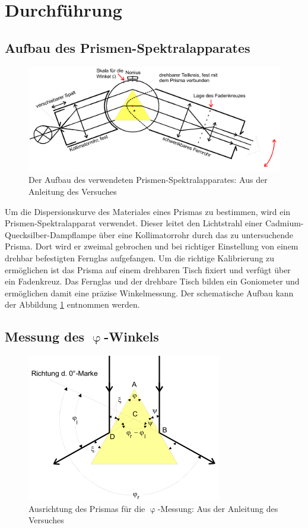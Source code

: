 \section{Durchführung}
\label{sec:Durchführung}
\subsection{Aufbau des Prismen-Spektralapparates}

\begin{figure}
  \centering
  \includegraphics[scale=0.7]{images/Aufbau.png}
  \caption{Der Aufbau des verwendeten Prismen-Spektralapparates: Aus der Anleitung des Versuches \cite[24]{1}}
  \label{fig:aufbau}
\end{figure}

Um die Dispersionskurve des Materiales eines Prismas zu bestimmen, wird ein Prismen-Spektralapparat verwendet.
Dieser leitet den Lichtstrahl einer Cadmium-Quecksilber-Dampflampe über eine Kollimatorrohr durch das zu untersuchende Prisma.
Dort wird er zweimal gebrochen und bei richtiger Einstellung von einem drehbar befestigten Fernglas aufgefangen.
Um die richtige Kalibrierung zu ermöglichen ist das Prisma auf einem drehbaren Tisch fixiert und verfügt über ein Fadenkreuz.
Das Fernglas und der drehbare Tisch bilden ein Goniometer und ermöglichen damit eine präzise Winkelmessung.
Der schematische Aufbau kann der Abbildung \ref{fig:aufbau} entnommen werden.

\subsection{Messung des \texorpdfstring{$\upvarphi$}{phi}-Winkels}

\begin{figure}[H]
  \centering
  \includegraphics[scale=0.6]{images/Phi.png}
  \caption{Ausrichtung des Prismas für die $\upvarphi$-Messung: Aus der Anleitung des Versuches \cite[26]{1}}
  \label{fig:Phi}
\end{figure}

